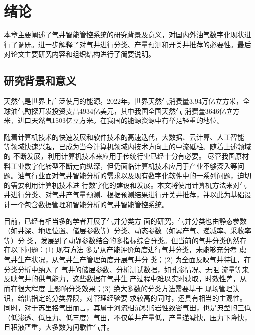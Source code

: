 \chapter{绪论}
本章主要阐述了气井智能管控系统的研究背景及意义，对国内外油气数字化现状进行了调研。进一步解释了对气井进行分类、产量预测和开关井推荐的必要性。最后对论文主要研究内容和组织结构进行了简要说明。
\section{研究背景和意义}
天然气是世界上广泛使用的能源。2022年，世界天然气消费量3.94万亿立方米，全球油气勘探开发投资支出4934亿美元，其中我国全国天然气
消费量3646亿立方米，进口天然气1503亿立方米\cite{chinaGasGOv}。在我国的能源资源中有举足轻重的地位。

随着计算机技术的快速发展和软件技术的高速迭代，大数据、云计算、人工智能
等领域快速兴起，已成为当今计算机领域内技术方向上的中流砥柱。随着上述领域的
不断发展，利用计算机技术来应用于传统行业已经十分有必要。
尽管我国原材料工业数字化转型不断走向纵深，但仍面临计算机技术应用于产业不够深入等问题\cite{workplanForPetrochemical}。油气行业面对气井智能分析的需求以及现有数字化软件中的一系列问题，迫切的需要利用计算机技术进
行数字化的建设和发展。本文将使用计算机方法来对气井进行分类、对气井产气量预测、根据预测结果进行开关井推荐，并以此为基础设计一个包含数据管理和智能分析的气井智能管控系统。

目前，已经有相当多的学者开展了气井分类方
面的研究，气井分类也由静态参数（如井深、地理位置、储层参数等\cite{NXSH200603007}）分类、动态参数（如累产气、递减率、采收率等\cite{FCYQ202102014}）分
类，发展到了动静参数结合的多指标综合分类。但当前的气井分类仍然存在以下问题：(1) 现有方法
多是从产能评价角度进行气井分类，未能够充分考
虑气井生产状况，从气井生产管理角度开展气井分
类；(2) 为全面反映气井特征，在分类分析中纳入了
气井的储层参数、分析测试数据，如孔渗情况、无阻
流量等来反映气井的供气能力，这些数据在气井生
产过程中难以实时获取，时效性差，从而在很大程度
上影响分类效果；(3) 绝大多数的分类方法需要基于
现场管理认识，给出指定的分类界限，对管理经验要
求较高的同时，还具有相当的主观性\cite{SYZC202104015}。同时，对于苏里格气田而言，其属于河流相沉积的岩性致密气田，也是典型的三低（低渗透、低压力、低丰度）气田，不仅单井产量低，产量递减快，压力下降快，且积液严重，大多数为间歇性气井\cite{KTSY202306014}。

